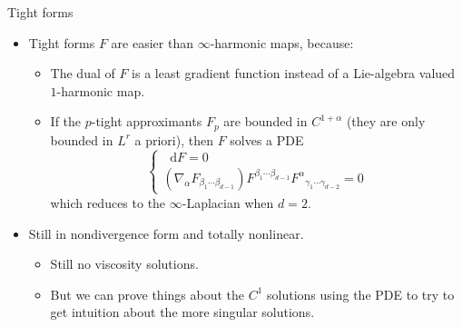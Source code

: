 \documentclass[10pt]{beamer}
\newcommand*\dif{\mathop{}\!\mathrm{d}}
\begin{document}
\begin{frame}{Tight forms}
\begin{itemize}
\item Tight forms $F$ are easier than $\infty$-harmonic maps, because:
\begin{itemize}
\item The dual of $F$ is a least gradient function instead of a Lie-algebra valued $1$-harmonic map.
\item If the $p$-tight approximants $F_p$ are bounded in $C^{1 + \alpha}$ (they are only bounded in $L^r$ a priori), then $F$ solves a PDE
$$\begin{cases}
    \dif F = 0 \\
    (\nabla_\alpha F_{\beta_1 \cdots \beta_{d - 1}}) F^{\beta_1 \cdots \beta_{d - 1}} {F^\alpha}_{\gamma_1 \cdots \gamma_{d - 2}} = 0
\end{cases}$$ 
which reduces to the $\infty$-Laplacian when $d = 2$. \pause
\end{itemize}
\item Still in nondivergence form and totally nonlinear.
\begin{itemize}
\item Still no viscosity solutions.
\item But we can prove things about the $C^1$ solutions using the PDE to try to get intuition about the more singular solutions.
\end{itemize}
\end{itemize}
\end{frame}
\end{document}
